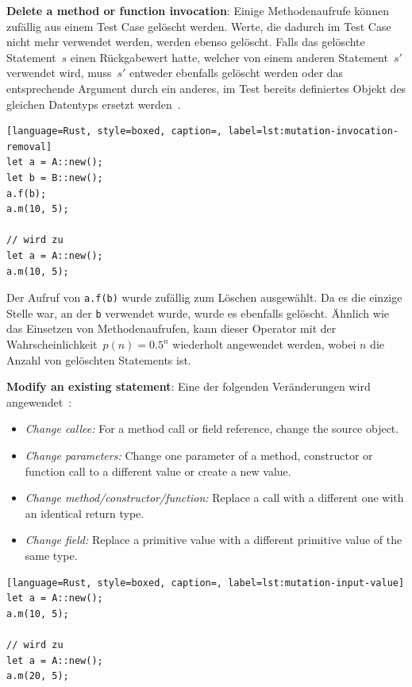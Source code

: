 \documentclass{article}
\begin{document}
\textbf{Delete a method or function invocation}: Einige Methodenaufrufe können zufällig aus einem Test Case gelöscht werden. Werte, die dadurch im Test Case nicht mehr verwendet werden, werden ebenso gelöscht. Falls das gelöschte Statement~$s$ einen Rückgabewert hatte, welcher von einem anderen Statement~$s'$ verwendet wird, muss~$s'$ entweder ebenfalls gelöscht werden oder das entsprechende Argument durch ein anderes, im Test bereits definiertes Objekt des gleichen Datentyps ersetzt werden~\cite{Fraser2012}.
\begin{lstlisting}[language=Rust, style=boxed, caption=, label=lst:mutation-invocation-removal]
let a = A::new();
let b = B::new();
a.f(b);
a.m(10, 5);

// wird zu
let a = A::new();
a.m(10, 5);
\end{lstlisting}
Der Aufruf von \lstinline{a.f(b)} wurde zufällig zum Löschen ausgewählt. Da es die einzige Stelle war, an der \lstinline{b} verwendet wurde, wurde es ebenfalls gelöscht. Ähnlich wie das Einsetzen von Methodenaufrufen, kann dieser Operator mit der Wahrscheinlichkeit~$p(n) = 0.5^n$ wiederholt angewendet werden, wobei $n$ die Anzahl von gelöschten Statements ist.

\textbf{Modify an existing statement}: Eine der folgenden Veränderungen wird angewendet~\cite{Fraser2012}:
\begin{itemize}
  \item \textit{Change callee:} For a method call or field reference, change the source object.
  \item \textit{Change parameters:} Change one parameter of a method, constructor or function call to a different value or create a new value.
  \item \textit{Change method/constructor/function:} Replace a call with a different one with an identical return type.
  \item \textit{Change field:} Replace a primitive value with a different primitive value of the same type.
\end{itemize}
\begin{lstlisting}[language=Rust, style=boxed, caption=, label=lst:mutation-input-value]
let a = A::new();
a.m(10, 5);

// wird zu
let a = A::new();
a.m(20, 5);
\end{lstlisting}
\end{document}
